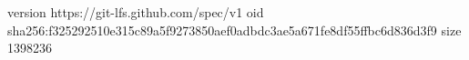 version https://git-lfs.github.com/spec/v1
oid sha256:f325292510e315c89a5f9273850aef0adbdc3ae5a671fe8df55ffbc6d836d3f9
size 1398236

